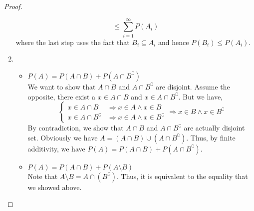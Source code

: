 \begin{proof}
\begin{enumerate}[noitemsep,topsep=0pt]
\begin{equation*}
                                    \leq \sum_{i=1}^\infty P(A_i)
    \end{equation*}
    where the last step uses the fact that $B_i \subseteq A_i$ and hence
    $P(B_i) \leq P(A_i)$.
\item
    \begin{itemize}[noitemsep,topsep=0pt]
    \item $P(A) = P(A \cap B) + P(A \cap B^\complement)$                     \\
    We want to show that $A \cap B$ and $A \cap B^\complement$ are disjoint.
    Assume the opposite, there exist a $x \in A \cap B$ and $x \in A \cap
    B^\complement$. But we have,
    \begin{equation*}
        \begin{cases}
        x \in A \cap B &\Rightarrow x \in A \land x \in B                    \\
        x \in A \cap B^\complement &\Rightarrow x \in A \land x \in
            B^\complement
        \end{cases} \Rightarrow
        x \in B \land x \in B^\complement
    \end{equation*}
    By contradiction, we show that $A \cap B$ and $A \cap B^\complement$ are
    actually disjoint set. Obviously we have $A = (A \cap B) \cup (A \cap
    B^\complement)$. Thus, by finite additivity, we have $P(A) = P(A \cap B) +
    P(A \cap B^\complement)$.
    \item $P(A) = P(A \cap B) + P(A \setminus B)$                            \\
    Note that $A \setminus B = A \cap (B^\complement)$. Thus, it is equivalent
    to the equality that we showed above.
    \end{itemize}
\end{enumerate}
\end{proof}

